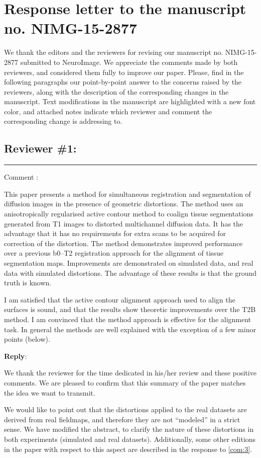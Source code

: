 \documentclass[9pt]{memoir}
\newcounter{reviewpoint}
\newenvironment{reviewpoint}%
{\refstepcounter{reviewpoint}\par\medskip\vspace{3ex}\hrule\vspace{1.5ex}\par\noindent%
   {\fontseries{b}\selectfont Comment \arabic{reviewpoint}:}
   \begingroup%
   \color{black!60}
   \fontshape{it}\selectfont %

}
{\endgroup\label{com:\thereviewpoint}\par\medskip}
\newcommand{\reply}{\par\fontshape{n}\selectfont \noindent \textbf{Reply}:\ }
\begin{document}
\hypersetup{linkcolor=black!60, citecolor=black!60, urlcolor=black!60}

\section*{Response letter to the manuscript no. NIMG-15-2877}

\bigskip
\noindent We thank the editors and the reviewers for revising our manuscript no. NIMG-15-2877 submitted to NeuroImage.
We appreciate the comments made by both reviewers, and considered them fully to improve our paper.
Please, find in the following paragraphs our point-by-point answer to the concerns raised by the reviewers,
  along with the description of the corresponding changes in the manuscript.
Text modifications in the manuscript are highlighted with a new font color, and attached notes indicate 
  which reviewer and comment the corresponding change is addressing to.

\bigskip
\bigskip
\subsection*{Reviewer \#1:}
\begin{reviewpoint}
This paper presents a method for simultaneous registration and segmentation of diffusion images in the presence of geometric distortions. The method uses an anisotropically regularised active contour method to coalign tissue segmentations generated from T1 images to distorted multichannel diffusion data. It has the advantage that it has no requirements for extra scans to be acquired for correction of the distortion. The method demonstrates improved performance over a previous b0--T2 registration approach for the alignment of tissue segmentation maps. Improvements are demonstrated on simulated data, and real data with simulated distortions. The advantage of these results is that the ground truth is known.


I am satisfied that the active contour alignment approach used to align the surfaces is sound, and that the results show theoretic improvements over the T2B method. I am convinced that the method approach is effective for the alignment task. In general the methods are well explained with the exception of a few minor points (below).
\end{reviewpoint}
\reply{%
We thank the reviewer for the time dedicated in his/her review and these positive comments.
We are pleased to confirm that this summary of the paper matches the idea we want to transmit.

We would like to point out that the distortions applied to the real datasets are derived from
  real fieldmaps, and therefore they are not ``modeled'' in a strict sense.
We have modified the abstract, to clarify the nature of these distortions in both experiments (simulated and real datasets).
Additionally, some other editions in the paper with respect to this aspect are
  described in the response to \autoref{com:3}.
}
\end{document}
